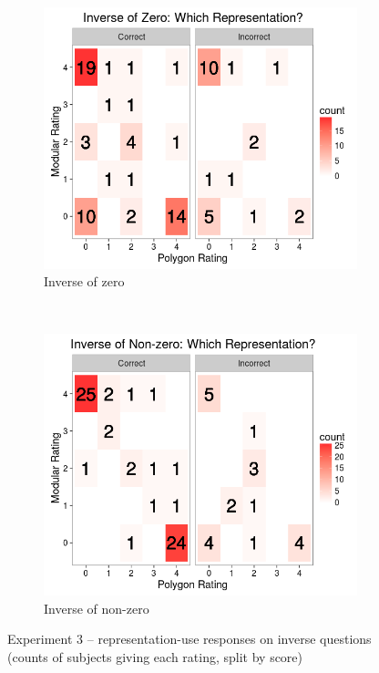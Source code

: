 \documentclass[man,10pt]{apa6}
\begin{document}
\begin{figure}
\centering
\begin{subfigure}[c]{0.45\textwidth}
\centering 
\includegraphics[width=\textwidth]{figures/3/wr_inZ.png}
\caption{Inverse of zero}
\end{subfigure}
~
\begin{subfigure}[c]{0.45\textwidth}
\centering 
\includegraphics[width=\textwidth]{figures/3/wr_inNZ.png}
\caption{Inverse of non-zero}
\end{subfigure}
\caption{Experiment 3 -- representation-use responses on inverse questions (counts of subjects giving each rating, split by score)}
\label{ex3_wr_in}
\end{figure}\noindent
\end{document}
